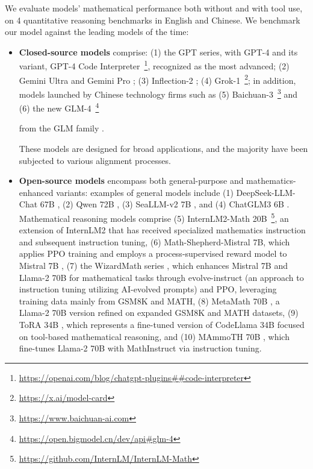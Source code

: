 \begin{itemize}[topsep=0pt]
We evaluate models' mathematical performance both without and with tool use, on 4 quantitative reasoning benchmarks in English and Chinese. We benchmark our model against the leading models of the time:

\begin{itemize}[topsep=0pt]
    \item \textbf{Closed-source models} comprise: (1) the GPT series, with GPT-4 \citep{gpt4} and its variant, GPT-4 Code Interpreter~\footnote{\url{https://openai.com/blog/chatgpt-plugins\#\#code-interpreter}}, recognized as the most advanced; (2) Gemini Ultra and Gemini Pro \citep{gemini}; (3) Inflection-2 \citep{inflection-2}; (4) Grok-1~\footnote{\url{https://x.ai/model-card}}; in addition, models launched by Chinese technology firms such as (5) Baichuan-3~\footnote{\url{https://www.baichuan-ai.com}} and (6) the new GLM-4~\footnote{\url{https://open.bigmodel.cn/dev/api\#glm-4}}

    from the GLM family \citep{glm}.

These models are designed for broad applications, and the majority have been subjected to various alignment processes.
    \item \textbf{Open-source models} encompass both general-purpose and mathematics-enhanced variants: examples of general models include (1) DeepSeek-LLM-Chat 67B \citep{deepseek-llm}, (2) Qwen 72B \citep{qwen}, (3) SeaLLM-v2 7B \citep{seallm}, and (4) ChatGLM3 6B \citep{chatglm3}. Mathematical reasoning models comprise (5) InternLM2-Math 20B~\footnote{\url{https://github.com/InternLM/InternLM-Math}}, an extension of InternLM2 that has received specialized mathematics instruction and subsequent instruction tuning, (6) Math-Shepherd-Mistral 7B, which applies PPO training \citep{schulman2017proximal} and employs a process-supervised reward model to Mistral 7B \citep{mistral}, (7) the WizardMath series \citep{wizardmath}, which enhances Mistral 7B and Llama-2 70B \citep{llama2} for mathematical tasks through evolve-instruct (an approach to instruction tuning utilizing AI-evolved prompts) and PPO, leveraging training data mainly from GSM8K and MATH, (8) MetaMath 70B \citep{metamath}, a Llama-2 70B version refined on expanded GSM8K and MATH datasets, (9) ToRA 34B \cite{tora}, which represents a fine-tuned version of CodeLlama 34B focused on tool-based mathematical reasoning, and (10) MAmmoTH 70B \citep{MathInstruct}, which fine-tunes Llama-2 70B with MathInstruct via instruction tuning.


\end{itemize}
\end{itemize}
